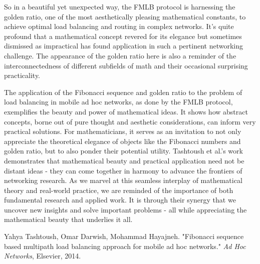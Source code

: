 \documentclass[12pt]{article}
\begin{document}
So in a beautiful yet unexpected way, the FMLB protocol is harnessing the golden ratio, one of the most aesthetically pleasing mathematical constants, to achieve optimal load balancing and routing in complex networks. It's quite profound that a mathematical concept revered for its elegance but sometimes dismissed as impractical has found application in such a pertinent networking challenge. The appearance of the golden ratio here is also a reminder of the interconnectedness of different subfields of math and their occasional surprising practicality.


The application of the Fibonacci sequence and golden ratio to the problem of load balancing in mobile ad hoc networks, as done by the FMLB protocol, exemplifies the beauty and power of mathematical ideas. It shows how abstract concepts, borne out of pure thought and aesthetic considerations, can inform very practical solutions. For mathematicians, it serves as an invitation to not only appreciate the theoretical elegance of objects like the Fibonacci numbers and golden ratio, but to also ponder their potential utility. Tashtoush et al.'s work demonstrates that mathematical beauty and practical application need not be distant ideas - they can come together in harmony to advance the frontiers of networking research. As we marvel at this seamless interplay of mathematical theory and real-world practice, we are reminded of the importance of both fundamental research and applied work. It is through their synergy that we uncover new insights and solve important problems - all while appreciating the mathematical beauty that underlies it all.



\newpage
\begin{thebibliography}{9}

Yahya Tashtoush, Omar Darwish, Mohammad Hayajneh. 
"Fibonacci sequence based multipath load balancing approach for mobile ad hoc networks." 
\textit{Ad Hoc Networks}, Elsevier, 2014.


\end{thebibliography}
\end{document}
